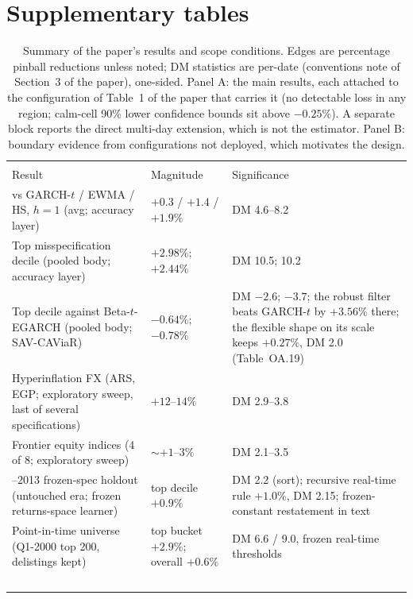 \documentclass[11pt]{article}
\begin{document}
\section{Supplementary tables}
\begin{table}[htbp]
\centering\small
\begin{threeparttable}
\caption{Summary of the paper's results and scope conditions. Edges are
percentage pinball reductions unless noted; DM statistics are per-date
(conventions note of Section~3 of the paper), one-sided. Panel A: the main results, each
attached to the configuration of Table~1 of the paper that carries it (no detectable loss in any
region; calm-cell 90\% lower confidence bounds sit above $-0.25\%$). A separate block reports the
direct multi-day extension, which is not the estimator. Panel B: boundary
evidence from configurations not deployed, which motivates the design.}
\label{tab:winloss}
\footnotesize\setlength{\tabcolsep}{3.5pt}
\begin{tabular}{>{\raggedright\arraybackslash}p{}>{\raggedright\arraybackslash}p{}>{\raggedright\arraybackslash}p{}}
\toprule
\multicolumn{3}{l}{\emph{Panel A: main results (configuration in parentheses)}} \\
Result & Magnitude & Significance \\
\midrule
vs GARCH-$t$ / EWMA / HS, $h{=}1$ (avg; accuracy layer) & $+0.3$ / $+1.4$ / $+1.9\%$ & DM 4.6--8.2 \\
Top misspecification decile (pooled body; accuracy layer) & $+2.98\%$; $+2.44\%$ & DM 10.5; 10.2 \\
Top decile against Beta-$t$-EGARCH (pooled body; SAV-CAViaR) & $-0.64\%$; $-0.78\%$ & DM $-2.6$; $-3.7$; the robust filter beats GARCH-$t$ by $+3.56\%$ there; the flexible shape on its scale keeps $+0.27\%$, DM 2.0 (Table~OA.19) \\
Hyperinflation FX (ARS, EGP; exploratory sweep, last of several specifications) & $+12$--$14\%$ & DM 2.9--3.8 \\
Frontier equity indices (4 of 8; exploratory sweep) & $\sim$$+1$--$3\%$ & DM 2.1--3.5 \\
2000--2013 frozen-spec holdout (untouched era; frozen returns-space learner) & top decile $+0.9\%$ & DM 2.2 (sort); recursive real-time rule $+1.0\%$, DM 2.15; frozen-constant restatement in text \\
Point-in-time universe (Q1-2000 top 200, delistings kept) & top bucket $+2.9\%$; overall $+0.6\%$ & DM 6.6 / 9.0, frozen real-time thresholds \\
$$
\end{tabular}
\end{threeparttable}
\end{table}
\end{document}
